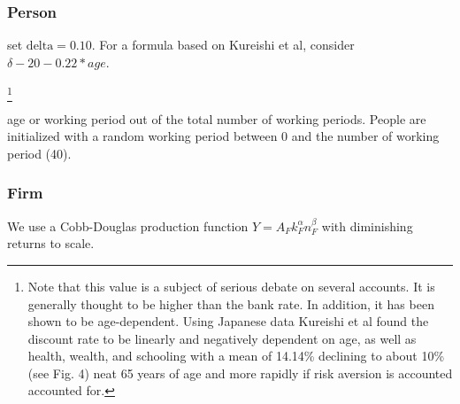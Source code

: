 \subsubsection{Person}
\begin{description}
{\color{red}
\item[subjective discount rate] set $\mathrm{delta} = 0.10$.  For a formula based on Kureishi et al, consider $\delta- 20-0.22*age$.}
\footnote{Note that this value is a subject of serious debate on several accounts. It is generally thought to be higher than the bank rate. In addition, it has been shown to be age-dependent. Using Japanese data Kureishi et al \cite{kureishiTimePreferencesLife2021} found the discount rate to be linearly and negatively dependent on age, as well as health, wealth, and schooling with a mean of 14.14\%  declining %
to about 10\% (see Fig. 4) neat 65 years of age and more rapidly if risk aversion is accounted accounted for. 
}



\item[working period] age or working period out of the total number of working periods. People are initialized with a random working period between 0 and the number of working period (40).
\end{description}

\subsubsection{Firm}
We use a Cobb-Douglas production function $Y=A_F k_F^\alpha  n_F^\beta$ with diminishing returns to scale. 

